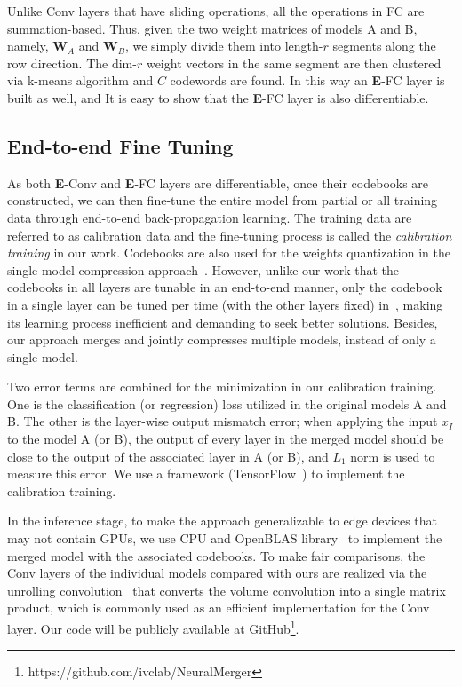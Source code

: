 \documentclass{article}
\begin{document}
	Unlike Conv layers that have sliding operations, all the operations in FC are summation-based.
	Thus, given the two weight matrices of models A and B, namely, $\mathbf{W}_A$ and $\mathbf{W}_B$, we simply divide them into length-$r$ segments along the row direction.
	The dim-$r$ weight vectors in the same segment are then clustered via k-means algorithm and $C$ codewords are found.
	In this way an \textbf{E}-FC layer is built as well, and
	It is easy to show that the \textbf{E}-FC layer is also differentiable. %
	
	\subsection{End-to-end Fine Tuning} %
	As both \textbf{E}-Conv and \textbf{E}-FC layers are differentiable, once their codebooks are constructed, we can then fine-tune the entire model from partial or all training data through end-to-end back-propagation learning.
	The training data are referred to as calibration data and the fine-tuning process is called the \emph{calibration training} in our work.
	Codebooks are also used for the weights quantization in the single-model compression approach~\cite{Wu16}.
	However, unlike our work that the codebooks in all layers are tunable in an end-to-end manner, only the codebook in a single layer can be tuned per time (with the other layers fixed) in~\cite{Wu16}, making its learning process inefficient and demanding to seek better solutions.
	Besides, our approach merges and jointly compresses multiple models, instead of only a single model.
	
	Two error terms are combined for the minimization in our calibration training.
	One is the classification (or regression) loss utilized in the original models A and B.
	The other is the layer-wise output mismatch error; %
	when applying the input $x_I$ to the model A (or B), the output of every layer in the merged model should be close to the output of the associated layer in A (or B), and $L_1$ norm is used to measure this error.
	We use a framework (TensorFlow~\cite{abadi2016tensorflow}) to implement the calibration training. %
	
	In the inference stage, to make the approach generalizable to edge devices that may not contain GPUs, we use CPU and OpenBLAS library~\cite{xianyi2012model,wang2013augem} to implement the merged model with the associated codebooks.
	To make fair comparisons, the Conv layers of the individual models compared with ours are realized via the unrolling convolution~\cite{chellapilla2006high,anwar2017structured} that converts the volume convolution into a single matrix product, which is commonly used as an efficient implementation for the Conv layer. Our code will be publicly available at GitHub\footnote{https://github.com/ivclab/NeuralMerger}.
	
\end{document}
